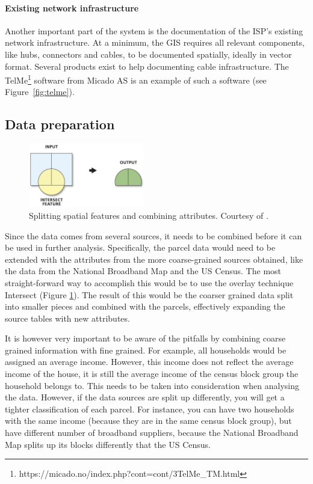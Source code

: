 \documentclass[twocolumn]{article}
\begin{document}
\paragraph{Existing network infrastructure}
\label{par:Existing network infrastructure}
Another important part of the system is the documentation of the ISP's existing network infrastructure. At a minimum, the GIS requires all relevant components, like hubs, connectors and cables, to be documented spatially, ideally in vector format. Several products exist to help documenting cable infrastructure. The TelMe\footnote{https://micado.no/index.php?cont=cont/3TelMe\_TM.html} software from Micado AS is an example of such a software (see Figure~\ref{fig:telme}).


\subsection{Data preparation}
\label{sub:GIS operations for combining data}
\begin{figure}
  \centering
  \includegraphics[width=0.45\textwidth]{img/intersect.png}
  \caption{Splitting spatial features and combining attributes. Courtesy of \cite{noauthor_undated-dw}.}
  \label{fig:intersect}
\end{figure}
Since the data comes from several sources, it needs to be combined before it can be used in further analysis. Specifically, the parcel data would need to be extended with the attributes from the more coarse-grained sources obtained, like the data from the National Broadband Map and the US Census. The most straight-forward way to accomplish this would be to use the overlay technique Intersect (Figure \ref{fig:intersect}). The result of this would be the coarser grained data split into smaller pieces and combined with the parcels, effectively expanding the source tables with new attributes. 

It is however very important to be aware of the pitfalls by combining coarse grained information with fine grained. For example, all households would be assigned an average income. However, this income does not reflect the average income of the house, it is still the average income of the census block group the household belongs to. This needs to be taken into consideration when analysing the data. However, if the data sources are split up differently, you will get a tighter classification of each parcel. For instance, you can have two households with the same income (because they are in the same census block group), but have different number of broadband suppliers, because the National Broadband Map splits up its blocks differently that the US Census.
\end{document}
